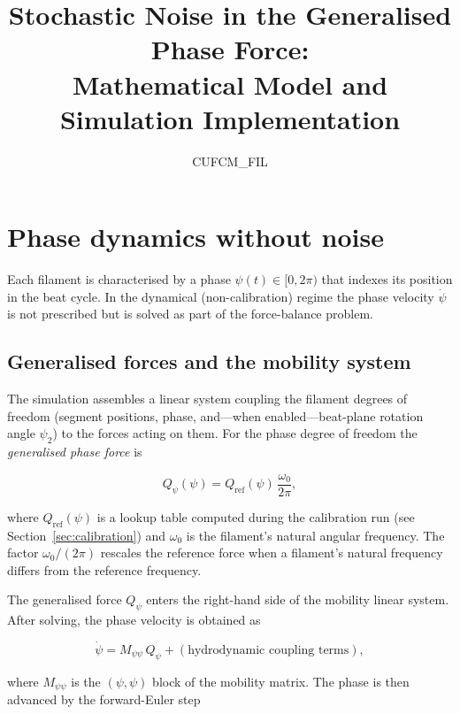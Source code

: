 \documentclass[11pt,a4paper]{article}
\title{Stochastic Noise in the Generalised Phase Force:\\
       Mathematical Model and Simulation Implementation}
\author{CUFCM\_FIL}
\date{}
\begin{document}
\maketitle

\section{Phase dynamics without noise}

Each filament is characterised by a phase $\psi(t)\in[0,2\pi)$ that indexes
its position in the beat cycle.  In the dynamical (non-calibration) regime the
phase velocity $\dot\psi$ is not prescribed but is solved as part of the
force-balance problem.

\subsection{Generalised forces and the mobility system}

The simulation assembles a linear system coupling the filament degrees of
freedom (segment positions, phase, and---when enabled---beat-plane rotation
angle $\psi_2$) to the forces acting on them.  For the phase degree of freedom
the \emph{generalised phase force} is

\begin{equation}
  Q_\psi(\psi) = Q_{\text{ref}}(\psi)\,\frac{\omega_0}{2\pi},
  \label{eq:qphase_det}
\end{equation}

where $Q_{\text{ref}}(\psi)$ is a lookup table computed during the calibration
run (see Section~\ref{sec:calibration}) and $\omega_0$ is the filament's
natural angular frequency.  The factor $\omega_0/(2\pi)$ rescales the reference
force when a filament's natural frequency differs from the reference frequency.

The generalised force $Q_\psi$ enters the right-hand side of the mobility
linear system.  After solving, the phase velocity is obtained as

\begin{equation}
  \dot\psi = M_{\psi\psi}\,Q_\psi + (\text{hydrodynamic coupling terms}),
\end{equation}

where $M_{\psi\psi}$ is the $({\psi},{\psi})$ block of the mobility matrix.
The phase is then advanced by the forward-Euler step
\end{document}
